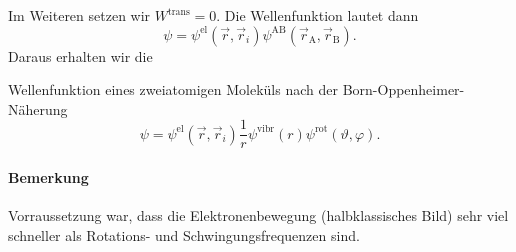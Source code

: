 	Im Weiteren setzen wir $W^{\text{trans}} =0$. Die Wellenfunktion lautet dann
	\begin{equation}
		\label{eq:4.8}\nonumber
		\psi = \psi^{\text{el}} (\Vec{r}, \Vec{r}_{i}) \psi^{\mathrm{AB}} (\Vec{r}_{\mathrm{A}}, \Vec{r}_{\mathrm{B}}).
	\end{equation}
	Daraus erhalten wir die
	\begin{important}
		Wellenfunktion eines zweiatomigen Moleküls nach der Born-Oppenheimer-Näherung
		\begin{equation}
			\psi= \psi^{\text{el}} (\Vec{r}, \Vec{r}_{i}) \frac{1}{r} \psi^{\text{vibr}} (r) \psi^{\text{rot}} ( \vartheta, \varphi).
		\end{equation}
	\end{important}

\paragraph{Bemerkung}
	Vorraussetzung war, dass die Elektronenbewegung (halbklassisches Bild) sehr viel schneller als Rotations- und Schwingungsfrequenzen sind.

